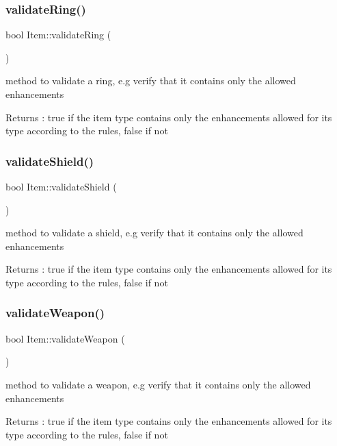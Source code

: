 \subsubsection{\texorpdfstring{validate\+Ring()}{validateRing()}}
{\footnotesize\ttfamily bool Item\+::validate\+Ring (\begin{DoxyParamCaption}{ }\end{DoxyParamCaption})}

method to validate a ring, e.\+g verify that it contains only the allowed enhancements \begin{DoxyReturn}{Returns}
\+: true if the item type contains only the enhancements allowed for its type according to the rules, false if not 
\end{DoxyReturn}
\hypertarget{class_item_ad5c772d7c46c965fc589cf571bb9c315}{}\label{class_item_ad5c772d7c46c965fc589cf571bb9c315} 
\subsubsection{\texorpdfstring{validate\+Shield()}{validateShield()}}
{\footnotesize\ttfamily bool Item\+::validate\+Shield (\begin{DoxyParamCaption}{ }\end{DoxyParamCaption})}

method to validate a shield, e.\+g verify that it contains only the allowed enhancements \begin{DoxyReturn}{Returns}
\+: true if the item type contains only the enhancements allowed for its type according to the rules, false if not 
\end{DoxyReturn}
\hypertarget{class_item_affb352894ddbc04bc0bb1b1ca3ac2cf1}{}\label{class_item_affb352894ddbc04bc0bb1b1ca3ac2cf1} 
\subsubsection{\texorpdfstring{validate\+Weapon()}{validateWeapon()}}
{\footnotesize\ttfamily bool Item\+::validate\+Weapon (\begin{DoxyParamCaption}{ }\end{DoxyParamCaption})}

method to validate a weapon, e.\+g verify that it contains only the allowed enhancements \begin{DoxyReturn}{Returns}
\+: true if the item type contains only the enhancements allowed for its type according to the rules, false if not 
\end{DoxyReturn}


